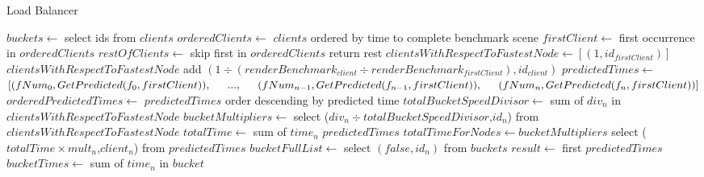 ﻿\documentclass[a4paper]{article}
\begin{document}
    \setcounter{algorithm}{1}
    \begin{algorithm}
        \caption{Load Balancer}\label{alg:cap}
        \begin{algorithmic}[1]
            \State $buckets \gets$ select ids from $clients$
            \State $orderedClients \gets$ $clients$ ordered by time to complete benchmark scene
            \State $firstClient \gets$ first occurrence in $orderedClients$
            \State $restOfClients \gets$ skip first in $orderedClients$ return rest
            \State $clientsWithRespectToFastestNode \gets [(1,id_{firstClient})]$
            \State
                \State $clientsWithRespectToFastestNode $ add $(1 \div (renderBenchmark_{client} \div renderBenchmark_{firstClient}),id_{client})$
            \EndFor
            \State $predictedTimes \gets$ \newline \indent $[(fNum_0, GetPredicted(f_0,firstClient)), \newline \indent ..., \newline \indent (fNum_{n-1}, GetPredicted(f_{n-1},firstClient)), \newline \indent (fNum_{n}, GetPredicted(f_{n},firstClient))]$
            \State $orderedPredictedTimes \gets$ $predictedTimes$ order descending by predicted time
            \State $totalBucketSpeedDivisor \gets$ sum of $div_n$ in $clientsWithRespectToFastestNode$
            \State $bucketMultipliers \gets$ select ($div_n \div totalBucketSpeedDivisor$,$id_n$) from $clientsWithRespectToFastestNode$
            \State $totalTime \gets$ sum of $time_n$ $predictedTimes$
            \State $totalTimeForNodes \gets bucketMultipliers$ select ($totalTime \times mult_n$,$client_n$) from $predictedTimes$
            \State $bucketFullList \gets$ select $(false,id_n)$ from $buckets$
            \State
                \State $result \gets$ first $predictedTimes$
                    \State $bucketTimes \gets$ sum of $time_n$ in $bucket$

\end{algorithmic}
\end{algorithm}
\end{document}
